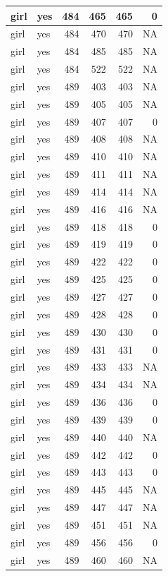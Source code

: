 \documentclass[man]{apa6}
\begin{document}
\begin{tabular}{l|l|r|r|r|r}
\hline
girl & yes & 484 & 465 & 465 & 0\\
\hline
girl & yes & 484 & 470 & 470 & NA\\
\hline
girl & yes & 484 & 485 & 485 & NA\\
\hline
girl & yes & 484 & 522 & 522 & NA\\
\hline
girl & yes & 489 & 403 & 403 & NA\\
\hline
girl & yes & 489 & 405 & 405 & NA\\
\hline
girl & yes & 489 & 407 & 407 & 0\\
\hline
girl & yes & 489 & 408 & 408 & NA\\
\hline
girl & yes & 489 & 410 & 410 & NA\\
\hline
girl & yes & 489 & 411 & 411 & NA\\
\hline
girl & yes & 489 & 414 & 414 & NA\\
\hline
girl & yes & 489 & 416 & 416 & NA\\
\hline
girl & yes & 489 & 418 & 418 & 0\\
\hline
girl & yes & 489 & 419 & 419 & 0\\
\hline
girl & yes & 489 & 422 & 422 & 0\\
\hline
girl & yes & 489 & 425 & 425 & 0\\
\hline
girl & yes & 489 & 427 & 427 & 0\\
\hline
girl & yes & 489 & 428 & 428 & 0\\
\hline
girl & yes & 489 & 430 & 430 & 0\\
\hline
girl & yes & 489 & 431 & 431 & 0\\
\hline
girl & yes & 489 & 433 & 433 & NA\\
\hline
girl & yes & 489 & 434 & 434 & NA\\
\hline
girl & yes & 489 & 436 & 436 & 0\\
\hline
girl & yes & 489 & 439 & 439 & 0\\
\hline
girl & yes & 489 & 440 & 440 & NA\\
\hline
girl & yes & 489 & 442 & 442 & 0\\
\hline
girl & yes & 489 & 443 & 443 & 0\\
\hline
girl & yes & 489 & 445 & 445 & NA\\
\hline
girl & yes & 489 & 447 & 447 & NA\\
\hline
girl & yes & 489 & 451 & 451 & NA\\
\hline
girl & yes & 489 & 456 & 456 & 0\\
\hline
girl & yes & 489 & 460 & 460 & NA\\

\end{tabular}
\end{document}
